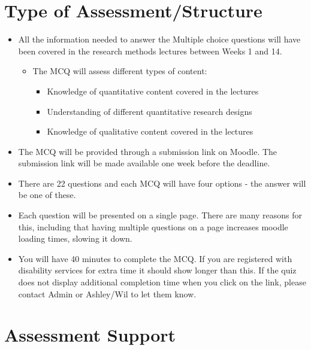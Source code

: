 \documentclass[
  english,
  letterpaper,
  DIV=11,
  numbers=noendperiod]{scrreprt}
\providecommand{\tightlist}{%
  \setlength{\itemsep}{0pt}\setlength{\parskip}{0pt}}
\begin{document}
\section{Type of
Assessment/Structure}\label{type-of-assessmentstructure-1}

\begin{itemize}
\item
  All the information needed to answer the Multiple choice questions
  will have been covered in the research methods lectures between Weeks
  1 and 14.

  \begin{itemize}
  \tightlist
  \item
    The MCQ will assess different types of content:

    \begin{itemize}
    \tightlist
    \item
      Knowledge of quantitative content covered in the lectures
    \item
      Understanding of different quantitative research designs\\
    \item
      Knowledge of qualitative content covered in the lectures
    \end{itemize}
  \end{itemize}
\item
  The MCQ will be provided through a submission link on Moodle. The
  submission link will be made available one week before the deadline.
\item
  There are 22 questions and each MCQ will have four options - the
  answer will be one of these.
\item
  Each question will be presented on a single page. There are many
  reasons for this, including that having multiple questions on a page
  increases moodle loading times, slowing it down.
\item
  You will have 40 minutes to complete the MCQ. If you are registered
  with disability services for extra time it should show longer than
  this. If the quiz does not display additional completion time when you
  click on the link, please contact Admin or Ashley/Wil to let them
  know.
\end{itemize}

\section{Assessment Support}\label{assessment-support-1}
\end{document}
